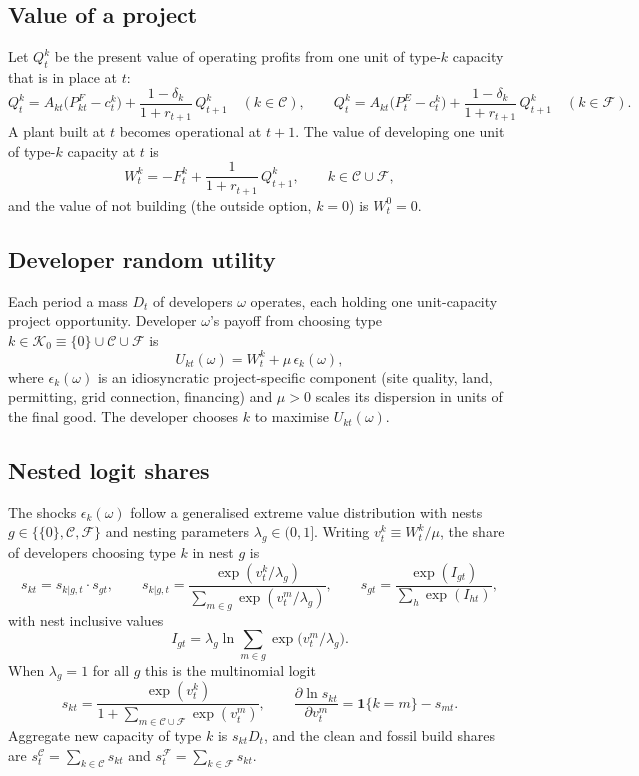 \documentclass[12pt]{article}
\begin{document}
\subsection{Value of a project}

Let $Q^k_t$ be the present value of operating profits from one unit of
type-$k$ capacity that is in place at $t$:
\[
Q^k_t=A_{kt}\big(P^F_{kt}-c^k_t\big)
+\frac{1-\delta_k}{1+r_{t+1}}\,Q^k_{t+1}
\quad(k\in\mathcal C),
\qquad
Q^k_t=A_{kt}\big(P^E_t-c^k_t\big)
+\frac{1-\delta_k}{1+r_{t+1}}\,Q^k_{t+1}
\quad(k\in\mathcal F).
\]
A plant built at $t$ becomes operational at $t+1$. The value of
developing one unit of type-$k$ capacity at $t$ is
\[
W^k_t=-F^k_t+\frac{1}{1+r_{t+1}}\,Q^k_{t+1},
\qquad k\in\mathcal C\cup\mathcal F,
\]
and the value of not building (the outside option, $k=0$) is $W^0_t=0$.

\subsection{Developer random utility}

Each period a mass $D_t$ of developers $\omega$ operates, each holding
one unit-capacity project opportunity. Developer $\omega$'s payoff from
choosing type $k\in\mathcal K_0\equiv\{0\}\cup\mathcal C\cup\mathcal F$
is
\[
U_{kt}(\omega)=W^k_t+\mu\,\epsilon_{k}(\omega),
\]
where $\epsilon_{k}(\omega)$ is an idiosyncratic project-specific
component (site quality, land, permitting, grid connection, financing)
and $\mu>0$ scales its dispersion in units of the final good. The
developer chooses $k$ to maximise $U_{kt}(\omega)$.

\subsection{Nested logit shares}

The shocks $\epsilon_{k}(\omega)$ follow a generalised extreme value
distribution with nests $g\in\{\{0\},\mathcal C,\mathcal F\}$ and nesting
parameters $\lambda_g\in(0,1]$. Writing $v^k_t\equiv W^k_t/\mu$, the
share of developers choosing type $k$ in nest $g$ is
\[
s_{kt}=s_{k|g,t}\cdot s_{gt},
\qquad
s_{k|g,t}=\frac{\exp(v^k_t/\lambda_g)}
{\sum_{m\in g}\exp(v^m_t/\lambda_g)},
\qquad
s_{gt}=\frac{\exp(I_{gt})}{\sum_{h}\exp(I_{ht})},
\]
with nest inclusive values
\[
I_{gt}=\lambda_g\ln\sum_{m\in g}\exp\big(v^m_t/\lambda_g\big).
\]
When $\lambda_g=1$ for all $g$ this is the multinomial logit
\[
s_{kt}=\frac{\exp(v^k_t)}{1+\sum_{m\in\mathcal C\cup\mathcal F}
\exp(v^m_t)},
\qquad
\frac{\partial\ln s_{kt}}{\partial v^m_t}=\mathbf 1\{k=m\}-s_{mt}.
\]
Aggregate new capacity of type $k$ is $s_{kt}D_t$, and the clean and
fossil build shares are $s^{\mathcal C}_t=\sum_{k\in\mathcal C}s_{kt}$
and $s^{\mathcal F}_t=\sum_{k\in\mathcal F}s_{kt}$.
\end{document}

